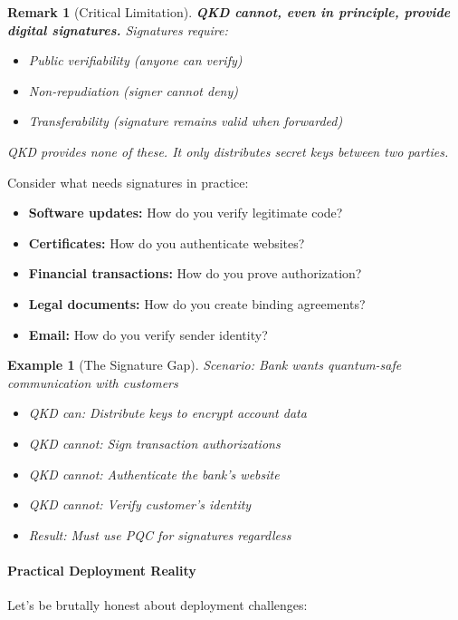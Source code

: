 \documentclass[11pt,a4paper]{article}
\newtheorem{example}{Example}
\newtheorem{remark}{Remark}
\begin{document}
\begin{remark}[Critical Limitation]
\textbf{QKD cannot, even in principle, provide digital signatures.} Signatures require:
\begin{itemize}
    \item Public verifiability (anyone can verify)
    \item Non-repudiation (signer cannot deny)
    \item Transferability (signature remains valid when forwarded)
\end{itemize}
QKD provides none of these. It only distributes secret keys between two parties.
\end{remark}

Consider what needs signatures in practice:
\begin{itemize}
    \item \textbf{Software updates:} How do you verify legitimate code?
    \item \textbf{Certificates:} How do you authenticate websites?
    \item \textbf{Financial transactions:} How do you prove authorization?
    \item \textbf{Legal documents:} How do you create binding agreements?
    \item \textbf{Email:} How do you verify sender identity?
\end{itemize}

\begin{example}[The Signature Gap]
Scenario: Bank wants quantum-safe communication with customers
\begin{itemize}
    \item QKD can: Distribute keys to encrypt account data
    \item QKD cannot: Sign transaction authorizations
    \item QKD cannot: Authenticate the bank's website
    \item QKD cannot: Verify customer's identity
    \item Result: Must use PQC for signatures regardless
\end{itemize}
\end{example}

\paragraph{Practical Deployment Reality}

Let's be brutally honest about deployment challenges:
\end{document}
